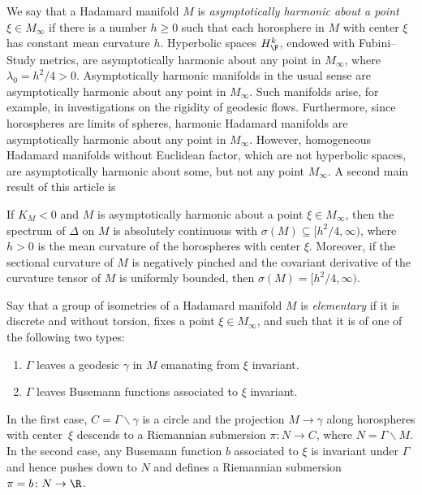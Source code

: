 We say that a Hadamard manifold $M$ is \emph{asymptotically harmonic about a point $\xi\in M_\infty$}
if there is a number $h\ge0$ such that each horosphere in $M$ with center $\xi$ has constant mean curvature $h$.
Hyperbolic spaces $H^k_{\F}$, endowed with Fubini--Study metrics, are asymptotically harmonic about any point in $M_\infty$, where $\lambda_0=h^2/4>0$.
Asymptotically harmonic manifolds in the usual sense are asymptotically harmonic about any point in $M_\infty$.
Such manifolds arise, for example, in investigations on the rigidity of geodesic flows.
Furthermore, since horospheres are limits of spheres,
harmonic Hadamard manifolds are asymptotically harmonic about any point in $M_\infty$.
However, homogeneous Hadamard manifolds without Euclidean factor,
which are not hyperbolic spaces, are asymptotically harmonic about some, but not any point $M_\infty$.
A second main result of this article is

\begin{Theorem}\label{onlyacm}
If $K_M<0$ and $M$ is asymptotically harmonic about a point $\xi\in M_\infty$,
then the spectrum of $\Delta$ on $M$ is absolutely continuous with $\sigma(M)\subseteq\bigl[h^2/4,\infty\bigr)$,
where $h>0$ is the mean curvature of the horospheres with center $\xi$.
Moreover, if the sectional curvature of $M$ is negatively pinched and the covariant derivative of the curvature tensor of $M$ is uniformly bounded, then $\sigma(M)=\bigl[h^2/4,\infty\bigr)$.
\end{Theorem}

Say that a group of isometries of a Hadamard manifold $M$ is \emph{elementary}
if it is discrete and without torsion, fixes a point $\xi\in M_\infty$,
and such that it is of one of the following two types:
\begin{enumerate}[label=(\alph*)]\itemsep=0pt
\item\label{ax} $\Gamma$ leaves a geodesic $\gamma$ in $M$ emanating from $\xi$ invariant.
\item\label{pa} $\Gamma$ leaves Busemann functions associated to $\xi$ invariant.
\end{enumerate}
In the first case, $C=\Gamma\backslash\gamma$ is a circle and the projection $M\to\gamma$
along horospheres with center~$\xi$ descends to a Riemannian submersion $\pi\colon N\to C$,
where $N=\Gamma\backslash M$.
In the second case,
any Busemann function $b$ associated to $\xi$ is invariant under $\Gamma$
and hence pushes down to $N$ and defines a Riemannian submersion $\pi=b\colon N\to\R$.

